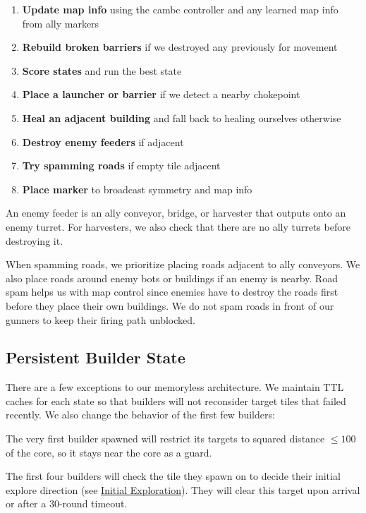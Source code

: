 \documentclass[10pt,sigconf,nonacm]{acmart}
\begin{document}
\begin{enumerate}
  \item \textbf{Update map info} using the cambc controller and any learned map info from ally markers
  \item \textbf{Rebuild broken barriers} if we destroyed any previously for movement
  \item \textbf{Score states} and run the best state
  \item \textbf{Place a launcher or barrier} if we detect a nearby chokepoint
  \item \textbf{Heal an adjacent building} and fall back to healing ourselves otherwise
  \item \textbf{Destroy enemy feeders} if adjacent
  \item \textbf{Try spamming roads} if empty tile adjacent
  \item \textbf{Place marker} to broadcast symmetry and map info
\end{enumerate}

An enemy feeder is an ally conveyor, bridge, or harvester that outputs onto an enemy turret. For harvesters, we also check that there are no ally turrets before destroying it.

When spamming roads, we prioritize placing roads adjacent to ally conveyors. We also place roads around enemy bots or buildings if an enemy is nearby. Road spam helps us with map control since enemies have to destroy the roads first before they place their own buildings. We do not spam roads in front of our gunners to keep their firing path unblocked.


\subsection*{Persistent Builder State}

There are a few exceptions to our memoryless architecture. We maintain TTL caches for each state so that builders will not reconsider target tiles that failed recently. We also change the behavior of the first few builders:

The very first builder spawned will restrict its targets to squared distance $\leq 100$ of the core, so it stays near the core as a guard.

The first four builders will check the tile they spawn on to decide their initial explore direction (see \hyperref[sec:initial-explore]{Initial Exploration}). They will clear this target upon arrival or after a $30$-round timeout.
\end{document}
